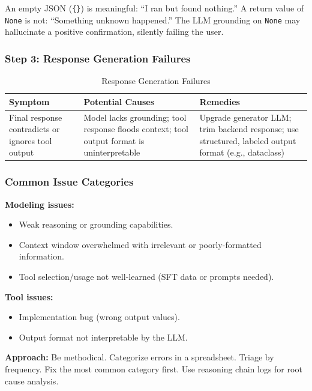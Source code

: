 \documentclass[11pt, a4paper]{article}
\begin{document}
\begin{warnbox}
An empty JSON (\texttt{\{\}}) is meaningful: ``I ran but found nothing.'' A return value of \texttt{None} is not: ``Something unknown happened.'' The LLM grounding on \texttt{None} may hallucinate a positive confirmation, silently failing the user.
\end{warnbox}

\subsubsection{Step 3: Response Generation Failures}

\begin{table}[h]
\centering
\caption{Response Generation Failures}
\begin{tabular}{@{}p{3cm}p{4.5cm}p{5cm}@{}}
\toprule
\textbf{Symptom} & \textbf{Potential Causes} & \textbf{Remedies} \\
\midrule
Final response contradicts or ignores tool output & Model lacks grounding; tool response floods context; tool output format is uninterpretable & Upgrade generator LLM; trim backend response; use structured, labeled output format (e.g., dataclass) \\
\bottomrule
\end{tabular}
\end{table}

\subsubsection{Common Issue Categories}

\begin{tealbox}
\textbf{Modeling issues:}
\begin{itemize}[leftmargin=1.5em]
  \item Weak reasoning or grounding capabilities.
  \item Context window overwhelmed with irrelevant or poorly-formatted information.
  \item Tool selection/usage not well-learned (SFT data or prompts needed).
\end{itemize}
\textbf{Tool issues:}
\begin{itemize}[leftmargin=1.5em]
  \item Implementation bug (wrong output values).
  \item Output format not interpretable by the LLM.
\end{itemize}
\textbf{Approach:} Be methodical. Categorize errors in a spreadsheet. Triage by frequency. Fix the most common category first. Use reasoning chain logs for root cause analysis.
\end{tealbox}
\end{document}
